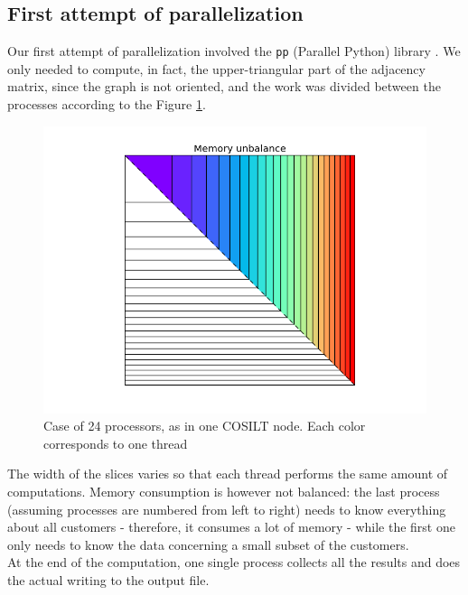 \documentclass[a4paper,11pt]{book}
\begin{document}
\subsection{First attempt of parallelization}
Our first attempt of parallelization involved the \lstinline!pp! (Parallel Python) library\cite{pp} . We only needed to compute, in fact, the upper-triangular part of the adjacency matrix, since the graph is not oriented, and the work was divided between the processes according to the Figure \ref{fig:old}.
\begin{figure}[H]
\centering
\includegraphics[height=8.415 cm,width=11.25 cm]{old.png}
\caption{Case of 24 processors, as in one COSILT node. Each color corresponds to one thread}\label{fig:old}
\end{figure}
The width of the slices varies so that each thread performs the same amount of computations. Memory consumption is however not balanced: the last process (assuming processes are numbered from left to right) needs to know everything about all customers - therefore, it consumes a lot of memory - while the first one only needs to know the data concerning a small subset of the customers.\\
At the end of the computation, one single process collects all the results and does the actual writing to the output file.\\
\end{document}
